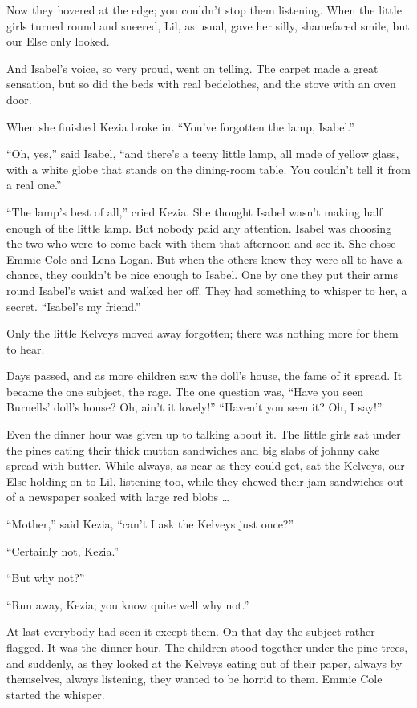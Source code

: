 \documentclass[10pt,a4paper]{article}
\begin{document}
Now they hovered at the edge; you couldn’t stop them listening. When the little girls turned round and sneered, Lil, as usual, gave her silly, shamefaced smile, but our Else only looked.

And Isabel’s voice, so very proud, went on telling. The carpet made a great sensation, but so did the beds with real bedclothes, and the stove with an oven door.

When she finished Kezia broke in. “You’ve forgotten the lamp, Isabel.”

“Oh, yes,” said Isabel, “and there’s a teeny little lamp, all made of yellow glass, with a white globe that stands on the dining-room table. You couldn’t tell it from a real one.”

“The lamp’s best of all,” cried Kezia. She thought Isabel wasn’t making half enough of the little lamp. But nobody paid any attention. Isabel was choosing the two who were to come back with them that afternoon and see it. She chose Emmie Cole and Lena Logan. But when the others knew they were all to have a chance, they couldn’t be nice enough to Isabel. One by one they put their arms round Isabel’s waist and walked her off. They had something to whisper to her, a secret. “Isabel’s my friend.”

Only the little Kelveys moved away forgotten; there was nothing more for them to hear.

Days passed, and as more children saw the doll’s house, the fame of it spread. It became the one subject, the rage. The one question was, “Have you seen Burnells’ doll’s house? Oh, ain’t it lovely!” “Haven’t you seen it? Oh, I say!”

Even the dinner hour was given up to talking about it. The little girls sat under the pines eating their thick mutton sandwiches and big slabs of johnny cake spread with butter. While always, as near as they could get, sat the Kelveys, our Else holding on to Lil, listening too, while they chewed their jam sandwiches out of a newspaper soaked with large red blobs …

“Mother,” said Kezia, “can’t I ask the Kelveys just once?”

“Certainly not, Kezia.”

“But why not?”

“Run away, Kezia; you know quite well why not.”

At last everybody had seen it except them. On that day the subject rather flagged. It was the dinner hour. The children stood together under the pine trees, and suddenly, as they looked at the Kelveys eating out of their paper, always by themselves, always listening, they wanted to be horrid to them. Emmie Cole started the whisper.
\end{document}
